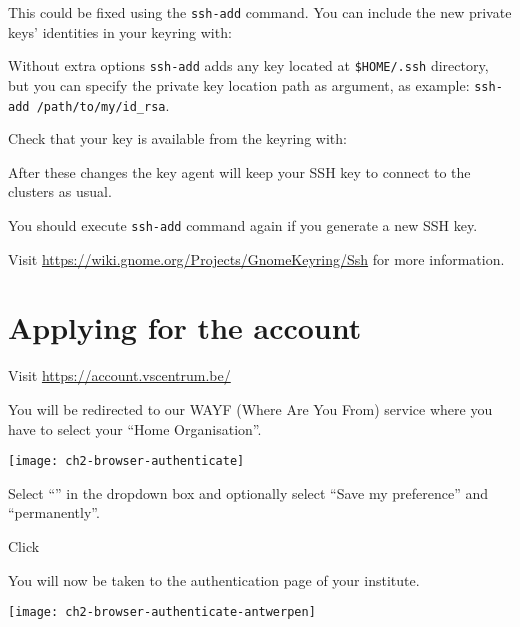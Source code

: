   This could be fixed using the \lstinline|ssh-add| command.
  You can include the new private keys' identities in your keyring with:

\begin{prompt}
\end{prompt}

\begin{tip}
  Without extra options \lstinline|ssh-add| adds any key located at \lstinline|$HOME/.ssh|
  directory, but you can specify the private key location path as argument,
  as example: \lstinline|ssh-add /path/to/my/id_rsa|.
\end{tip}

Check that your key is available from the keyring with:
\begin{prompt}
\end{prompt}

  After these changes the key agent will keep your SSH key to connect
  to the clusters as usual.
\begin{tip}
  You should execute \lstinline|ssh-add| command again if you generate a new SSH key.
\end{tip}

\iflinux
  Visit \url{https://wiki.gnome.org/Projects/GnomeKeyring/Ssh} for
  more information.
\fi
\fi %

\section{Applying for the account}
\label{sec:applying-for-the-account}

Visit \url{https://account.vscentrum.be/}

You will be redirected to our WAYF (Where Are You From) service where you have to select your ``Home Organisation''.

\begin{center}
\texttt{[image: ch2-browser-authenticate]}
\end{center}

Select ``\wayf'' in the dropdown box and optionally select ``Save my preference'' and ``permanently''.

Click 

You will now be taken to the authentication page of your institute.

\ifantwerpen
\begin{center}
\texttt{[image: ch2-browser-authenticate-antwerpen]}
\end{center}

